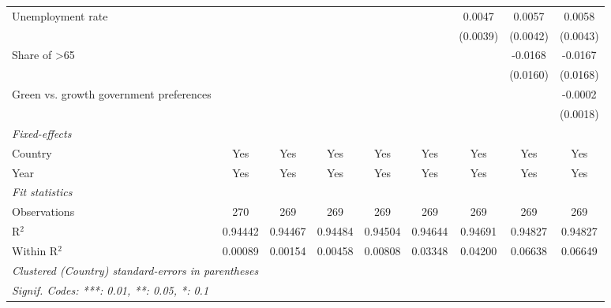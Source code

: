 \begin{table}[htbp]
\begin{tabular}{lcccccccc}
      Unemployment rate                                              &          &          &          &          &          & 0.0047   & 0.0057   & 0.0058\\   
                                                                     &          &          &          &          &          & (0.0039) & (0.0042) & (0.0043)\\   
      Share of >65                                                   &          &          &          &          &          &          & -0.0168  & -0.0167\\   
                                                                     &          &          &          &          &          &          & (0.0160) & (0.0168)\\   
      Green vs. growth government preferences                        &          &          &          &          &          &          &          & -0.0002\\   
                                                                     &          &          &          &          &          &          &          & (0.0018)\\   
      \midrule
      \emph{Fixed-effects}\\
      Country                                                        & Yes      & Yes      & Yes      & Yes      & Yes      & Yes      & Yes      & Yes\\  
      Year                                                           & Yes      & Yes      & Yes      & Yes      & Yes      & Yes      & Yes      & Yes\\  
      \midrule
      \emph{Fit statistics}\\
      Observations                                                   & 270      & 269      & 269      & 269      & 269      & 269      & 269      & 269\\  
      R$^2$                                                          & 0.94442  & 0.94467  & 0.94484  & 0.94504  & 0.94644  & 0.94691  & 0.94827  & 0.94827\\  
      Within R$^2$                                                   & 0.00089  & 0.00154  & 0.00458  & 0.00808  & 0.03348  & 0.04200  & 0.06638  & 0.06649\\  
      \midrule \midrule
      \multicolumn{9}{l}{\emph{Clustered (Country) standard-errors in parentheses}}\\
      \multicolumn{9}{l}{\emph{Signif. Codes: ***: 0.01, **: 0.05, *: 0.1}}\\
   \end{tabular}
\end{table}



